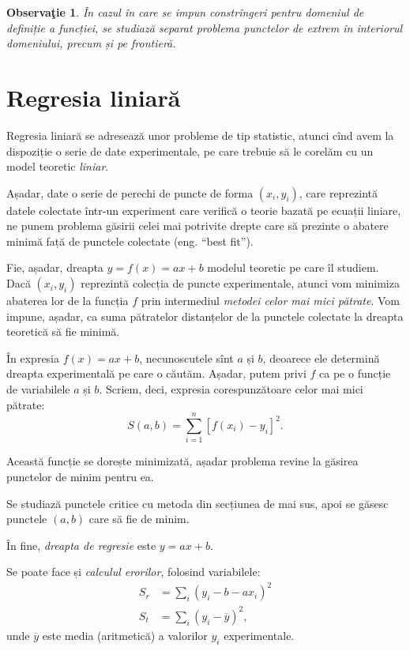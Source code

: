\documentclass[11pt,a4paper]{article}
\theoremstyle{dotless}
\theoremstyle{dotlessdr}
\newtheorem{remark}{Observa\c{t}ie}[section]
\begin{document}
\begin{remark}\label{rk:frontiera}
  În cazul în care se impun constrîngeri pentru domeniul de definiție a funcției,
  se studiază separat problema punctelor de extrem în interiorul domeniului,
  precum și pe frontieră.
\end{remark}




\section{Regresia liniară}
\label{sec:reg-lin}

Regresia liniară se adresează unor probleme de tip statistic, atunci cînd avem
la dispoziție o serie de date experimentale, pe care trebuie să le corelăm cu
un model teoretic \emph{liniar}.

Așadar, date o serie de perechi de puncte de forma $(x_i, y_i)$, care reprezintă
datele colectate într-un experiment care verifică o teorie bazată pe ecuații
liniare, ne punem problema găsirii celei mai potrivite drepte care să prezinte
o abatere minimă față de punctele colectate (eng. ``best fit'').

Fie, așadar, dreapta $y = f(x) = ax + b$ modelul teoretic pe care îl studiem.
Dacă $(x_i, y_i)$ reprezintă colecția de puncte experimentale, atunci vom minimiza
abaterea lor de la funcția $f$ prin intermediul \emph{metodei celor mai mici pătrate}.
Vom impune, așadar, ca suma pătratelor distanțelor de la punctele colectate la
dreapta teoretică să fie minimă.

În expresia $f(x) = ax + b$, necunoscutele sînt $a$ și $b$, deoarece ele determină
dreapta experimentală pe care o căutăm. Așadar, putem privi $f$ ca pe o funcție
de variabilele $a$ și $b$. Scriem, deci, expresia corespunzătoare celor mai
mici pătrate:
\[
  S(a, b) = \sum_{i = 1}^n [ f(x_i) - y_i ]^2.
\]

Această funcție se dorește minimizată, așadar problema revine la găsirea punctelor
de minim pentru ea.

Se studiază punctele critice cu metoda din secțiunea de mai sus, apoi se
găsesc punctele $(a, b)$ care să fie de minim.

În fine, \emph{dreapta de regresie} este $y = ax + b$.

Se poate face și \emph{calculul erorilor}, folosind variabilele:
\begin{align*}
  S_r &= \sum_i (y_i - b - ax_i)^2 \\
  S_t &= \sum_i (y_i - \overline{y})^2,
\end{align*}
unde $\overline{y}$ este media (aritmetică) a valorilor $y_i$ experimentale.
\end{document}
